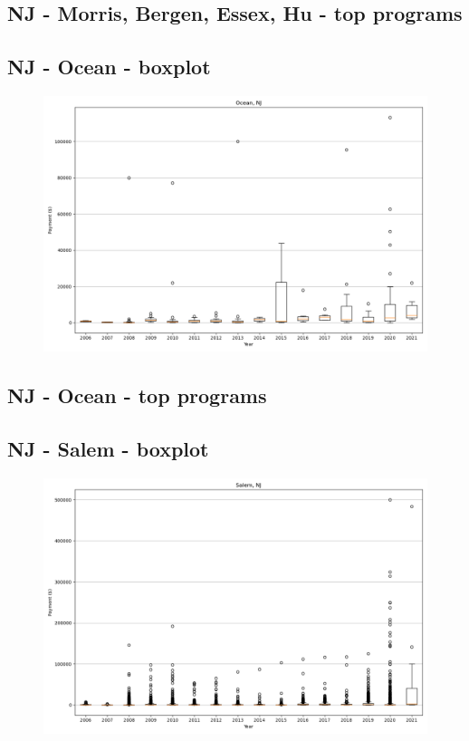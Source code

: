 \subsection*{NJ - Morris, Bergen, Essex, Hu - top programs}

\newpage
\subsection*{NJ - Ocean - boxplot}
\begin{figure}[h]
\centering
\includegraphics[width=7in]{../output/boxplots/counties/Ocean-NJ_boxplot.png}
\end{figure}


\subsection*{NJ - Ocean - top programs}

\newpage
\subsection*{NJ - Salem - boxplot}
\begin{figure}[h]
\centering
\includegraphics[width=7in]{../output/boxplots/counties/Salem-NJ_boxplot.png}
\end{figure}


